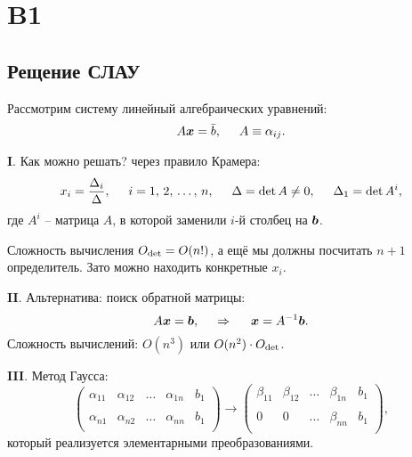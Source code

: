 \section{B1}


\subsection*{Рещение СЛАУ}

Рассмотрим систему линейный алгебраических уравнений:
\begin{equation*}
    A \mbox{\boldmath $x$} = \bar{b}, \hspace{5 mm} 
    A \equiv \alpha_{ij}.
\end{equation*}

\textbf{I}. Как можно решать? через правило Крамера:
\begin{equation*}
    x_i = \frac{\Delta_i}{\Delta}, \hspace{5 mm} i = 1,\, 2,\, \ldots,\, n,
    \hspace{5 mm} 
    \Delta = \det A \neq 0, \hspace{5 mm} 
    \Delta_1 = \det A^i,
\end{equation*}
где $A^i$ -- матрица $A$, в которой заменили $i$-й столбец на $\mbox{\boldmath $b$}$.  

Сложность вычисления $O_{\textnormal{det}} = O(n!)$, а ещё мы должны посчитать $n+1$ определитель.  
Зато можно находить конкретные $x_i$. 


\textbf{II}.  Альтернатива: поиск обратной матрицы:
\begin{equation*}
    A \mbox{\boldmath $x$} = \mbox{\boldmath $b$},
    \hspace{0.5cm} \Rightarrow \hspace{0.5cm}
    \mbox{\boldmath $x$} = A^{-1} \mbox{\boldmath $b$}.
\end{equation*}
Сложность вычислений: $O(n^3)$ или $O(n^2) \cdot O_{\textnormal{det}}$. 

\textbf{III}. Метод Гаусса:
\begin{equation*}
    \begin{pmatrix}
        \alpha_{11} & \alpha_{12} & \ldots & \alpha_{1n} &b_1 \\
        &&&& \\
        \alpha_{n1} & \alpha_{n2} & \ldots & \alpha_{nn} &b_1 \\
    \end{pmatrix}
    \to
    \begin{pmatrix}
        \beta_{11} & \beta_{12} & \ldots & \beta_{1n} &b_1 \\
        &&&& \\
        0 & 0 & \ldots & \beta_{nn} &b_1 \\
    \end{pmatrix},
\end{equation*}
который реализуется элементарными преобразованиями. 

